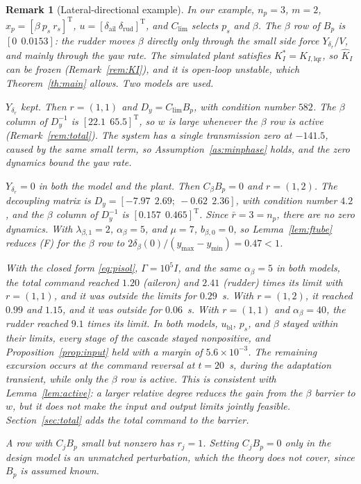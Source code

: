 \documentclass[lettersize,journal]{IEEEtran}
\newtheorem{remark}{Remark}
\newcommand{\Kh}{\hat{K}}
\newcommand{\ub}{u_{\mathrm{bl}}}
\newcommand{\Clim}{C_{\mathrm{lim}}}
\newcommand{\T}{\mathrm{T}}
\begin{document}
\begin{remark}[Lateral-directional example] \label{rem:example}
In our example, $n_p=3$, $m=2$, $x_p=[\beta\ p_s\ r_s]^\T$, $u=[\delta_{\mathrm{ail}}\ \delta_{\mathrm{rud}}]^\T$, and $\Clim$ selects $p_s$ and $\beta$. The $\beta$ row of $B_p$ is $[0\ \ 0.0153]$: the rudder moves $\beta$ directly only through the small side force $Y_{\delta_r}/V$, and mainly through the yaw rate. The simulated plant satisfies $K_I^*=K_{I,\mathrm{lqr}}$, so $\Kh_I$ can be frozen (Remark~\ref{rem:KI}), and it is open-loop unstable, which Theorem~\ref{th:main} allows. Two models are used.

\emph{$Y_{\delta_r}$ kept.} Then $r=(1,1)$ and $D_y=\Clim B_p$, with condition number $582$. The $\beta$ column of $D_y^{-1}$ is $[22.1\ \ 65.5]^\T$, so $w$ is large whenever the $\beta$ row is active (Remark~\ref{rem:total}). The system has a single transmission zero at $-141.5$, caused by the same small term, so Assumption~\ref{as:minphase} holds, and the zero dynamics bound the yaw rate.

\emph{$Y_{\delta_r}=0$ in both the model and the plant.} Then $C_\beta B_p=0$ and $r=(1,2)$. The decoupling matrix is $D_y=[-7.97\ \ 2.69;\ -0.62\ \ 2.36]$, with condition number $4.2$, and the $\beta$ column of $D_y^{-1}$ is $[0.157\ \ 0.465]^\T$. Since $\bar r=3=n_p$, there are no zero dynamics. With $\lambda_{\beta,1}=2$, $\alpha_\beta=5$, and $\mu=7$, $b_{\beta,0}=0$, so Lemma~\ref{lem:ftube} reduces (F) for the $\beta$ row to $2\delta_\beta(0)/(y_{\max}-y_{\min})=0.47<1$.

With the closed form \eqref{eq:pisol}, $\Gamma=10^5I$, and the same $\alpha_\beta=5$ in both models, the total command reached $1.20$ (aileron) and $2.41$ (rudder) times its limit with $r=(1,1)$, and it was outside the limits for $0.29$~s. With $r=(1,2)$, it reached $0.99$ and $1.15$, and it was outside for $0.06$~s. With $r=(1,1)$ and $\alpha_\beta=40$, the rudder reached $9.1$ times its limit. In both models, $\ub$, $p_s$, and $\beta$ stayed within their limits, every stage of the cascade stayed nonpositive, and Proposition~\ref{prop:input} held with a margin of $5.6\times10^{-3}$. The remaining excursion occurs at the command reversal at $t=20$~s, during the adaptation transient, while only the $\beta$ row is active. This is consistent with Lemma~\ref{lem:active}: a larger relative degree reduces the gain from the $\beta$ barrier to $w$, but it does not make the input and output limits jointly feasible. Section~\ref{sec:total} adds the total command to the barrier.

A row with $C_jB_p$ small but nonzero has $r_j=1$. Setting $C_jB_p=0$ only in the design model is an unmatched perturbation, which the theory does not cover, since $B_p$ is assumed known.
\end{remark}
\end{document}

